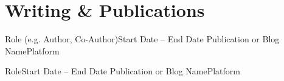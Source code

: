 \section{Writing \& Publications}
  \resumeSubHeadingListStart

    \resumeSubheading
      {Role (e.g. Author, Co-Author)}{Start Date -- End Date}
      {Publication or Blog Name}{Platform}
      \resumeItemListStart
      \resumeItemListEnd

    \resumeSubheading
      {Role}{Start Date -- End Date}
      {Publication or Blog Name}{Platform}
      \resumeItemListStart
      \resumeItemListEnd

  \resumeSubHeadingListEnd
